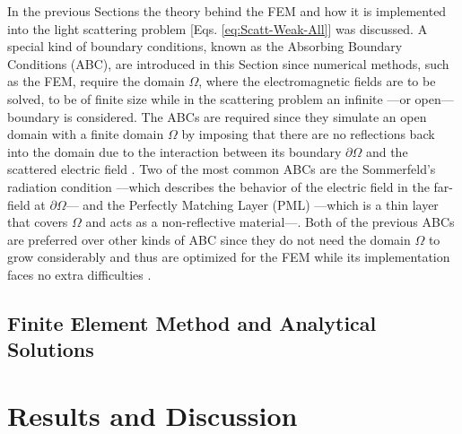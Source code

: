 \documentclass[11pt]{Latex/Classes/PhDthesisPSnPDF}
\begin{document}
        In the previous Sections the theory behind the FEM and how it is  implemented into the light scattering problem [Eqs. \eqref{eq:Scatt-Weak-All}] was discussed. A special kind of boundary conditions, known as the Absorbing Boundary Conditions (ABC), are introduced in this Section since numerical methods, such as the FEM, require the domain $\Omega$, where the electromagnetic fields are to be solved, to be of finite size \cite{jin_theory_2010,bondeson_computational_2005} while in the scattering problem an infinite ---or open--- boundary is considered. The  ABCs are required since they simulate an open domain with a finite domain $\Omega$ by imposing that there are no reflections back into the domain due to the interaction between its boundary $\partial\Omega$ and the scattered electric field \cite{bondeson_computational_2005,jin_theory_2010,chew_complex_1997}. Two of the most common ABCs are the Sommerfeld's radiation condition ---which describes the behavior of the electric field in the far-field at $\partial\Omega$--- and the Perfectly Matching Layer (PML) ---which is a thin layer that covers $\Omega$ and acts as a non-reflective material---\cite{jin_theory_2010}.  Both of the previous ABCs are preferred over other kinds of ABC since they do not need the domain $\Omega$ to grow considerably and thus are optimized for the FEM while its implementation faces no extra difficulties \cite{jin_theory_2010}.

         

	\section{Finite Element Method and Analytical Solutions}
		\label{sec:FEM-Mie}
		

%

\chapter{Results and Discussion}
	\label{ch:Results}
\end{document}
